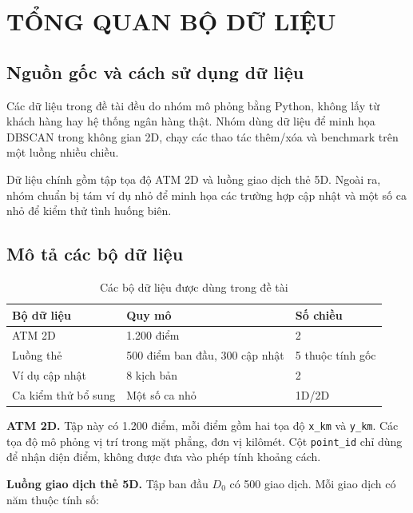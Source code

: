 \chapter{TỔNG QUAN BỘ DỮ LIỆU}

\section{Nguồn gốc và cách sử dụng dữ liệu}

Các dữ liệu trong đề tài đều do nhóm mô phỏng bằng Python, không lấy từ khách hàng hay hệ thống ngân hàng thật. Nhóm dùng dữ liệu để minh họa DBSCAN trong không gian 2D, chạy các thao tác thêm/xóa và benchmark trên một luồng nhiều chiều.

Dữ liệu chính gồm tập tọa độ ATM 2D và luồng giao dịch thẻ 5D. Ngoài ra, nhóm chuẩn bị tám ví dụ nhỏ để minh họa các trường hợp cập nhật và một số ca nhỏ để kiểm thử tình huống biên.

\section{Mô tả các bộ dữ liệu}

\begin{table}[H]
\centering
\caption{Các bộ dữ liệu được dùng trong đề tài}
\label{tab:dataset_overview}
\normalsize
\begin{tabularx}{\textwidth}{|Y|P{4cm}|P{2.5cm}|}\hline
\textbf{Bộ dữ liệu} & \textbf{Quy mô} & \textbf{Số chiều} \\\hline
ATM 2D & 1.200 điểm & 2 \\\hline
Luồng thẻ & 500 điểm ban đầu, 300 cập nhật & 5 thuộc tính gốc \\\hline
Ví dụ cập nhật & 8 kịch bản & 2 \\\hline
Ca kiểm thử bổ sung & Một số ca nhỏ & 1D/2D \\\hline
\end{tabularx}
\end{table}

\textbf{ATM 2D.} Tập này có 1.200 điểm, mỗi điểm gồm hai tọa độ \texttt{x\_km} và \texttt{y\_km}. Các tọa độ mô phỏng vị trí trong mặt phẳng, đơn vị kilômét. Cột \texttt{point\_id} chỉ dùng để nhận diện điểm, không được đưa vào phép tính khoảng cách.

\textbf{Luồng giao dịch thẻ 5D.} Tập ban đầu \(D_0\) có 500 giao dịch. Mỗi giao dịch có năm thuộc tính số:

